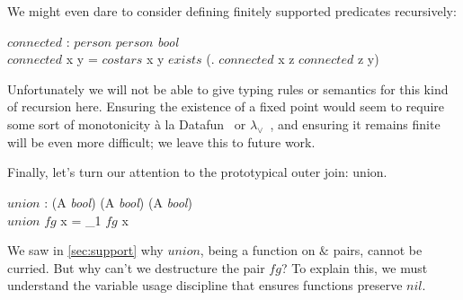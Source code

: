 \documentclass[runningheads]{llncs}
\newcommand\name[1]{\ensuremath{\mathit{#1}}}
\newcommand\<\:                 %
\newcommand\fnspace{\<}         %
\newcommand\fn[1]{\lambda{#1}.\fnspace}
\newcommand\lto\multimap        %
\newcommand\fto\Rightarrow
\newcommand\with{\mathbin{\&}}
\newcommand\ox\otimes
\newcommand\typename\textit
\newcommand\bool{\typename{bool}}
\newcommand\kword[1]{\ensuremath{\textrm{#1}}}
\newcommand\nil{\name{nil}}
\newcommand\tand{\mathrel{\kword{and}}}
\newcommand\tor{\mathrel{\kword{or}}}
\begin{document}
\noindent
We might even dare to consider defining finitely supported predicates recursively:

\begin{code}
  \name{connected} : \name{person} \fto \name{person} \fto \bool\\
  \name{connected} \<x \<y = \name{costars} \<x \<y
  \tor \name{exists}\< (\fn{z} \name{connected} \<x \<z \tand \name{connected} \<z \<y)
\end{code}

\noindent
Unfortunately we will not be able to give typing rules or semantics for this kind of recursion here.
Ensuring the existence of a fixed point would seem to require some sort of monotonicity \`a la Datafun~\cite{datafun} or $\lambda_\vee$~\cite{DBLP:journals/pacmpl/RiouxZ25}, and ensuring it remains finite will be even more difficult; we leave this to future work.

Finally, let's turn our attention to the prototypical outer join: union.

\begin{code}
  \name{union} : (A \fto \bool) \with (A \fto \bool) \lto (A \fto \bool)\\
  \name{union} \<\name{fg} \<x =
    {\pi_1 \<\name{fg} \<x} \tor {\pi_2 \<\name{fg} \<x}
\end{code}

\noindent
We saw in \cref{sec:support} why \name{union}, being a function on $\with$ pairs, cannot be curried.
But why can't we destructure the pair $\name{fg}$?
To explain this, we must understand the variable usage discipline that ensures functions preserve \nil.



\end{document}
